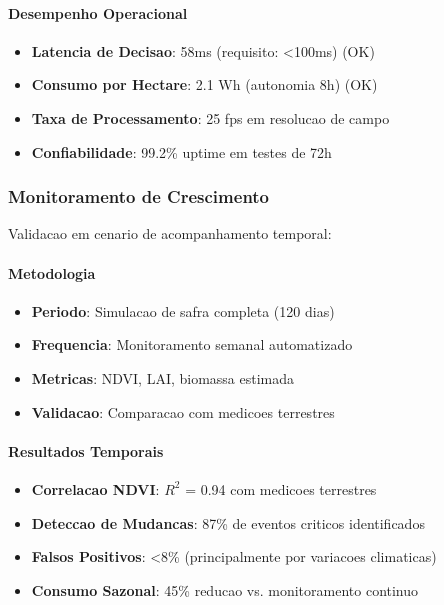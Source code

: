 \paragraph{Desempenho Operacional}
\begin{itemize}
    \item \textbf{Latencia de Decisao}: 58ms (requisito: <100ms) (OK)
    \item \textbf{Consumo por Hectare}: 2.1 Wh (autonomia 8h) (OK)
    \item \textbf{Taxa de Processamento}: 25 fps em resolucao de campo
    \item \textbf{Confiabilidade}: 99.2\% uptime em testes de 72h
\end{itemize}

\subsubsection{Monitoramento de Crescimento}
Validacao em cenario de acompanhamento temporal:

\paragraph{Metodologia}
\begin{itemize}
    \item \textbf{Periodo}: Simulacao de safra completa (120 dias)
    \item \textbf{Frequencia}: Monitoramento semanal automatizado
    \item \textbf{Metricas}: NDVI, LAI, biomassa estimada
    \item \textbf{Validacao}: Comparacao com medicoes terrestres
\end{itemize}

\paragraph{Resultados Temporais}
\begin{itemize}
    \item \textbf{Correlacao NDVI}: $R^2$ = 0.94 com medicoes terrestres
    \item \textbf{Deteccao de Mudancas}: 87\% de eventos criticos identificados
    \item \textbf{Falsos Positivos}: <8\% (principalmente por variacoes climaticas)
    \item \textbf{Consumo Sazonal}: 45\% reducao vs. monitoramento continuo
\end{itemize}

